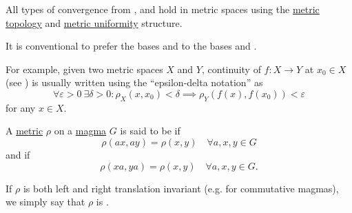 \begin{remark}\label{rem:metric_space_convergence}
  All types of convergence from ,  and  hold in metric spaces using the \hyperref[def:metric_topology]{metric topology} and \hyperref[def:metric_uniformity]{metric uniformity} structure.

  It is conventional to prefer the bases  and  to the bases  and .

  For example, given two metric spaces \( X \) and \( Y \), continuity of \( f: X \to Y \) at \( x_0 \in X \) (see ) is usually written using the \enquote{epsilon-delta notation} as
  \begin{equation*}
    \forall \varepsilon > 0 \ \exists \delta > 0 : \rho_X(x, x_0) < \delta \implies \rho_Y(f(x), f(x_0)) < \varepsilon
  \end{equation*}
  for any \( x \in X \).
\end{remark}

\begin{definition}\label{def:translation_invariant_metric}
  A \hyperref[def:metric_space]{metric} \( \rho \) on a \hyperref[def:group/magma]{magma} \( G \) is said to be  if
  \begin{equation*}
    \rho(ax, ay) = \rho(x, y) \quad\forall a, x, y \in G
  \end{equation*}
  and  if
  \begin{equation*}
    \rho(xa, ya) = \rho(x, y) \quad\forall a, x, y \in G.
  \end{equation*}

  If \( \rho \) is both left and right translation invariant (e.g. for commutative magmas), we simply say that \( \rho \) is .
\end{definition}

